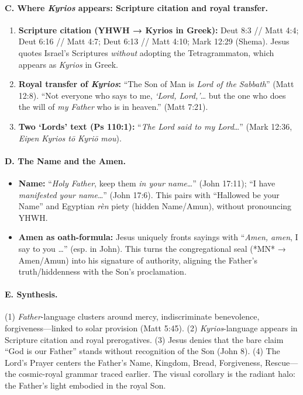 \paragraph{C. Where \emph{Kyrios} appears: Scripture citation and royal transfer.}
\begin{enumerate}
  \item \textbf{Scripture citation (YHWH → Kyrios in Greek):} Deut 8:3 // Matt 4:4; Deut 6:16 // Matt 4:7; Deut 6:13 // Matt 4:10; Mark 12:29 (Shema). Jesus quotes Israel’s Scriptures \emph{without} adopting the Tetragrammaton, which appears as \emph{Kyrios} in Greek.
  \item \textbf{Royal transfer of \emph{Kyrios}:} “The Son of Man is \emph{Lord of the Sabbath}” (Matt 12:8). “Not everyone who says to me, \emph{‘Lord, Lord,’}… but the one who does the will of \emph{my Father} who is in heaven.” (Matt 7:21).
  \item \textbf{Two ‘Lords’ text (Ps 110:1):} “\emph{The Lord said to my Lord}…” (Mark 12:36, \emph{Eipen Kyrios tō Kyriō mou}).
\end{enumerate}

\paragraph{D. The Name and the Amen.}
\begin{itemize}
  \item \textbf{Name:} “\emph{Holy Father}, keep them \emph{in your name}…” (John 17:11); “I have \emph{manifested your name}…” (John 17:6). This pairs with “Hallowed be your Name” and Egyptian \emph{r\`en} piety (hidden Name/Amun), without pronouncing YHWH.
  \item \textbf{Amen as oath-formula:} Jesus uniquely fronts sayings with “\emph{Amen, amen}, I say to you …” (esp. in John). This turns the congregational seal (*MN* → Amen/Amun) into his signature of authority, aligning the Father’s truth/hiddenness with the Son’s proclamation.
\end{itemize}

\paragraph{E. Synthesis.}
(1) \emph{Father}-language clusters around mercy, indiscriminate benevolence, forgiveness—linked to solar provision (Matt 5:45). (2) \emph{Kyrios}-language appears in Scripture citation and royal prerogatives. (3) Jesus denies that the bare claim “God is our Father” stands without recognition of the Son (John 8). (4) The Lord’s Prayer centers the Father’s Name, Kingdom, Bread, Forgiveness, Rescue—the cosmic-royal grammar traced earlier. The visual corollary is the radiant halo: the Father’s light embodied in the royal Son.

